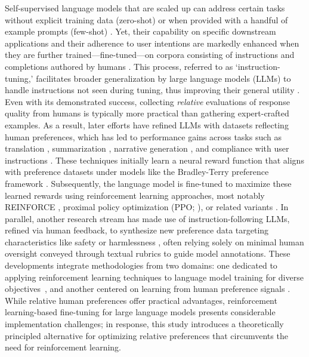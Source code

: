 Self-supervised language models that are scaled up can address certain tasks without explicit training data (zero-shot) \citep{radford2019language} or when provided with a handful of example prompts (few-shot) \citep{gpt3,megatron,chowdhery2022palm}. Yet, their capability on specific downstream applications and their adherence to user intentions are markedly enhanced when they are further trained—fine-tuned—on corpora consisting of instructions and completions authored by humans \citep{mishra-etal-2022-cross,sanh2022multitask,chung2022scaling,thoppilan2022lamda}. This process, referred to as `instruction-tuning,’ facilitates broader generalization by large language models (LLMs) to handle instructions not seen during tuning, thus improving their general utility \citep{chung2022scaling}. Even with its demonstrated success, collecting \textit{relative} evaluations of response quality from humans is typically more practical than gathering expert-crafted examples. As a result, later efforts have refined LLMs with datasets reflecting human preferences, which has led to performance gains across tasks such as translation \citep{kreutzer-etal-2018-reliability}, summarization \citep{stiennon2022learning,ziegler2020finetuning}, narrative generation \citep{ziegler2020finetuning}, and compliance with user instructions \citep{ouyang2022training,ramamurthy2023is}. These techniques initially learn a neural reward function that aligns with preference datasets under models like the Bradley-Terry preference framework \citep{bradley1952rankanalysis}. Subsequently, the language model is fine-tuned to maximize these learned rewards using reinforcement learning approaches, most notably REINFORCE \citep{williams1992reinforce}, proximal policy optimization (PPO; \cite{schulman2017proximal}), or related variants \citep{ramamurthy2023is}. In parallel, another research stream has made use of instruction-following LLMs, refined via human feedback, to synthesize new preference data targeting characteristics like safety or harmlessness \citep{bai2022constitutional}, often relying solely on minimal human oversight conveyed through textual rubrics to guide model annotations. These developments integrate methodologies from two domains: one dedicated to applying reinforcement learning techniques to language model training for diverse objectives~\citep{Ranzato2015SequenceLT,paulus2018a,wu2018learning}, and another centered on learning from human preference signals \citep{christiano2017deep,kupcsik2018learning}. While relative human preferences offer practical advantages, reinforcement learning-based fine-tuning for large language models presents considerable implementation challenges; in response, this study introduces a theoretically principled alternative for optimizing relative preferences that circumvents the need for reinforcement learning.

